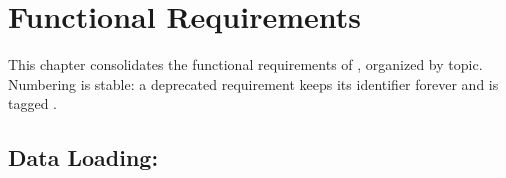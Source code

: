 
\chapter{Functional Requirements}
\label{ch:functional}

This chapter consolidates the functional requirements of \itc{}, organized
by topic. Numbering is stable: a deprecated requirement keeps its
 identifier forever and is tagged \deprecated{}.

\section{Data Loading: }

